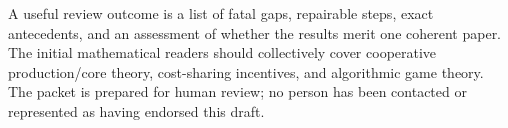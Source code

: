 \documentclass[11pt]{article}
\begin{document}
A useful review outcome is a list of fatal gaps, repairable steps, exact
antecedents, and an assessment of whether the results merit one coherent
paper. The initial mathematical readers should collectively cover cooperative
production/core theory, cost-sharing incentives, and algorithmic game theory.
The packet is prepared for human review; no person has been contacted or
represented as having endorsed this draft.
\end{document}
